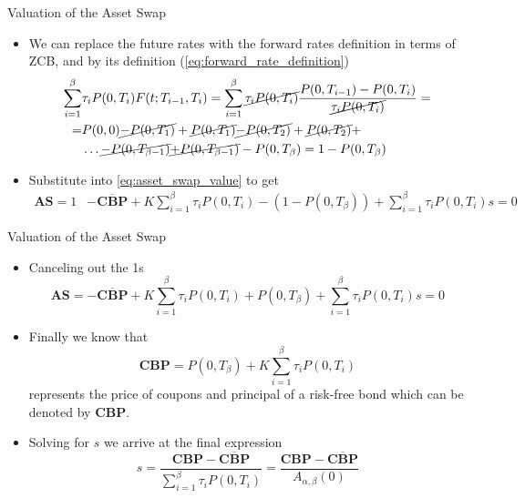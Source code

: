 \documentclass{beamer}
\begin{document}
\begin{frame}{Valuation of the Asset Swap}
\begin{itemize}
	\item We can replace the future rates with the forward rates definition in terms of ZCB, and by its definition (\cref{eq:forward_rate_definition})
	\begin{equation*}
        \begin{aligned}
            \sum_{i=1}^\beta &\tau_i P(0,T_i)F(t;T_{i-1},T_i) =  \sum_{i=1}^\beta \cancel{\tau_i P(0,T_i)}\frac{P(0,T_{i-1})-P(0,T_i)}{\cancel{\tau_i P(0,T_i)}} = \\
            = &P(0,0) \cancel{- P(0,T_1)} + \cancel{P(0,T_1)} \cancel{- P(0,T_2)} + \cancel{P(0,T_2)} + \\
            &\ldots \cancel{- P(0, T_{\beta-1})} \cancel{+ P(0, T_{\beta-1})}-P(0,T_\beta) = 1-P(0,T_\beta)
        \end{aligned}
    \end{equation*}
	\item Substitute into \cref{eq:asset_swap_value} to get
	\begin{equation*}
        \begin{aligned}
            \textbf{AS}=1&-\overline{\textbf{CBP}}+K\sum_{i=1}^{\beta}\tau_i P(0,T_i) -(1-P(0,T_\beta))
            + \sum_{i=1}^\beta\tau_i P(0,T_i)s=0
        \end{aligned}
    \end{equation*}
\end{itemize}
\end{frame}

\begin{frame}{Valuation of the Asset Swap}
\begin{itemize}
	\item Canceling out the 1s
	\begin{equation*}
		\textbf{AS}=-\overline{\textbf{CBP}}+K\sum_{i=1}^\beta\tau_i P(0,T_i) + P(0,T_\beta) + \sum_{i=1}^{\beta}\tau_i P(0,T_i)s=0
	\end{equation*}
	\item Finally we know that
	\begin{equation*}
			\textbf{CBP} = P(0,T_\beta) + K\sum_{i=1}^\beta\tau_i P(0,T_i)
		\end{equation*}
	represents the price of coupons and principal of a  risk-free bond which can be denoted by \textbf{CBP}.
	\item Solving for $s$ we arrive at the final expression
	\begin{equation}
		\boxed{s = \frac{\textbf{CBP}-\overline{\textbf{CBP}}}{\sum_{i=1}^{\beta}\tau_iP(0,T_i)} =  \frac{\textbf{CBP} - \overline{\textbf{CBP}}}{A_{\alpha,\beta}(0)}}
	\end{equation}
	\myendproof
\end{itemize}
\end{frame}
\end{document}

